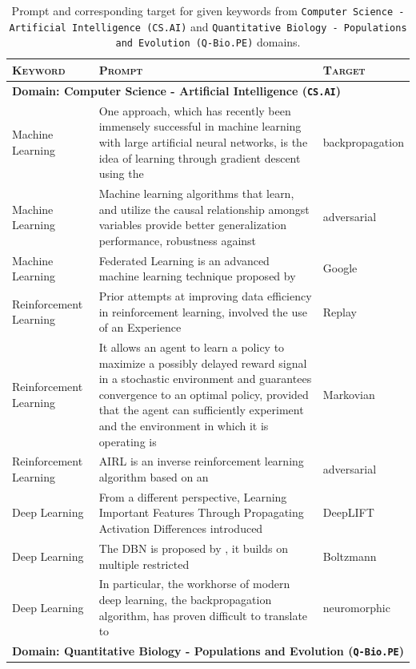\documentclass[10pt]{article}
\begin{document}
\begin{table}
    \centering
    \caption{Prompt and corresponding target for given keywords from \texttt{Computer Science - Artificial Intelligence (CS.AI)} and \texttt{Quantitative Biology - Populations and Evolution (Q-Bio.PE)} domains.}
    \renewcommand{\arraystretch}{1.2}
    \begin{tabular}{p{3.5cm}p{9cm}p{2cm}}
\toprule
\textsc{Keyword} & \textsc{Prompt} & \textsc{Target} \\
\midrule
\multicolumn{3}{l}{\textbf{Domain: Computer Science - Artificial Intelligence (\texttt{CS.AI})}} \\
\midrule
Machine Learning & One approach, which has recently been immensely successful in machine learning with large artificial neural networks, is the idea of learning through gradient descent using the & backpropagation \\
Machine Learning & Machine learning algorithms that learn, and utilize the causal relationship amongst variables provide better generalization performance, robustness against & adversarial \\
Machine Learning & Federated Learning is an advanced machine learning technique proposed by & Google \\
Reinforcement Learning & Prior attempts at improving data efficiency in reinforcement learning, involved the use of an Experience & Replay \\
Reinforcement Learning & It allows an agent to learn a policy to maximize a possibly delayed reward signal in a stochastic environment and guarantees convergence to an optimal policy, provided that the agent can sufficiently experiment and the environment in which it is operating is & Markovian \\
Reinforcement Learning & AIRL is an inverse reinforcement learning algorithm based on an & adversarial \\
Deep Learning & From a different perspective, Learning Important Features Through Propagating Activation Differences introduced & DeepLIFT \\
Deep Learning & The DBN is proposed by , it builds on multiple restricted & Boltzmann \\
Deep Learning & In particular, the workhorse of modern deep learning, the backpropagation algorithm, has proven difficult to translate to & neuromorphic \\
\midrule
\multicolumn{3}{l}{\textbf{Domain: Quantitative Biology - Populations and Evolution (\texttt{Q-Bio.PE})}} \\

\end{tabular}
\end{table}
\end{document}
